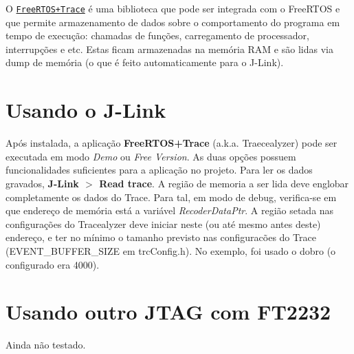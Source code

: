 O \href{http://www.freertos.org/FreeRTOS-Plus/FreeRTOS_Plus_Trace/FreeRTOS_Plus_Trace.shtml}{\tt Free\-R\-T\-O\-S+\-Trace} é uma biblioteca que pode ser integrada com o Free\-R\-T\-O\-S e que permite armazenamento de dados sobre o comportamento do programa em tempo de execução\-: chamadas de funções, carregamento de processador, interrupções e etc. Estas ficam armazenadas na memória R\-A\-M e são lidas via dump de memória (o que é feito automaticamente para o J-\/\-Link).\hypertarget{page_freertosplustrace_page_freertosplustrace_section_jlink}{}\section{Usando o J-\/\-Link}\label{page_freertosplustrace_page_freertosplustrace_section_jlink}
Após instalada, a aplicação {\bfseries Free\-R\-T\-O\-S+\-Trace} (a.\-k.\-a. Traecealyzer) pode ser executada em modo {\itshape Demo} ou {\itshape Free Version}. As duas opções possuem funcionalidades suficientes para a aplicação no projeto. Para ler os dados gravados, {\bfseries J-\/\-Link $>$ Read trace}. A região de memoria a ser lida deve englobar completamente os dados do Trace. Para tal, em modo de debug, verifica-\/se em que endereço de memória está a variável {\itshape Recoder\-Data\-Ptr}. A região setada nas configurações do Tracealyzer deve iniciar neste (ou até mesmo antes deste) endereço, e ter no mínimo o tamanho previsto nas configuracões do Trace (E\-V\-E\-N\-T\-\_\-\-B\-U\-F\-F\-E\-R\-\_\-\-S\-I\-Z\-E em trc\-Config.\-h). No exemplo, foi usado o dobro (o configurado era 4000).



\hypertarget{page_freertosplustrace_page_freertosplustrace_section_ft2232}{}\section{Usando outro J\-T\-A\-G com F\-T2232}\label{page_freertosplustrace_page_freertosplustrace_section_ft2232}
Ainda não testado. 